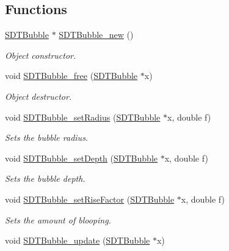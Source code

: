 \subsection*{Functions}
\begin{DoxyCompactItemize}
\item 
\hyperlink{group__bubbles_ga112f59b24c7a304d0ff6280c98cf7e75}{S\+D\+T\+Bubble} $\ast$ \hyperlink{group__bubbles_gac69094ba71af6a065520a824b784f119}{S\+D\+T\+Bubble\+\_\+new} ()
\begin{DoxyCompactList}\small\item\em Object constructor. \end{DoxyCompactList}\item 
void \hyperlink{group__bubbles_ga684ec1f5b434c7faa961a7665815867b}{S\+D\+T\+Bubble\+\_\+free} (\hyperlink{group__bubbles_ga112f59b24c7a304d0ff6280c98cf7e75}{S\+D\+T\+Bubble} $\ast$x)
\begin{DoxyCompactList}\small\item\em Object destructor. \end{DoxyCompactList}\item 
void \hyperlink{group__bubbles_ga82b35f8a2ac8f122aa7daa1c82048de0}{S\+D\+T\+Bubble\+\_\+set\+Radius} (\hyperlink{group__bubbles_ga112f59b24c7a304d0ff6280c98cf7e75}{S\+D\+T\+Bubble} $\ast$x, double f)
\begin{DoxyCompactList}\small\item\em Sets the bubble radius. \end{DoxyCompactList}\item 
void \hyperlink{group__bubbles_ga9654e6c4c3df2c83c18a3697fcbf6c87}{S\+D\+T\+Bubble\+\_\+set\+Depth} (\hyperlink{group__bubbles_ga112f59b24c7a304d0ff6280c98cf7e75}{S\+D\+T\+Bubble} $\ast$x, double f)
\begin{DoxyCompactList}\small\item\em Sets the bubble depth. \end{DoxyCompactList}\item 
void \hyperlink{group__bubbles_ga944bbb593d6a56aef2d3e19380a6908d}{S\+D\+T\+Bubble\+\_\+set\+Rise\+Factor} (\hyperlink{group__bubbles_ga112f59b24c7a304d0ff6280c98cf7e75}{S\+D\+T\+Bubble} $\ast$x, double f)
\begin{DoxyCompactList}\small\item\em Sets the amount of blooping. \end{DoxyCompactList}\item 
\hypertarget{group__bubbles_ga538ac5581fa91ee6e0a3cfa9d4dca699}{}void \hyperlink{group__bubbles_ga538ac5581fa91ee6e0a3cfa9d4dca699}{S\+D\+T\+Bubble\+\_\+update} (\hyperlink{group__bubbles_ga112f59b24c7a304d0ff6280c98cf7e75}{S\+D\+T\+Bubble} $\ast$x)\label{group__bubbles_ga538ac5581fa91ee6e0a3cfa9d4dca699}


\end{DoxyCompactItemize}

